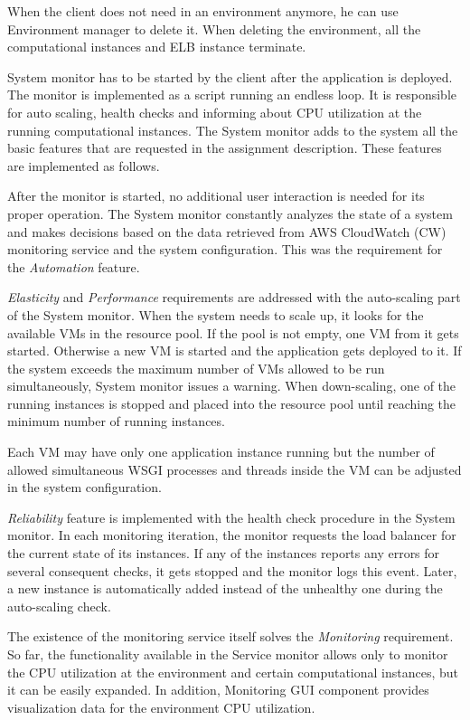 \documentclass[conference]{IEEEtran}
\begin{document}
When the client does not need in an environment anymore, he can use Environment manager to delete it. When deleting the environment, all the computational instances and ELB instance terminate.

System monitor has to be started by the client after the application is deployed. The monitor is implemented as a script running an endless loop. It is responsible for auto scaling, health checks and informing about CPU utilization at the running computational instances. The System monitor adds to the system all the basic features that are requested in the assignment description. These features are implemented as follows.

After the monitor is started, no additional user interaction is needed for its proper operation. The System monitor constantly analyzes the state of a system and makes decisions based on the data retrieved from AWS CloudWatch (CW) monitoring service and the system configuration. This was the requirement for the \emph{Automation} feature. 

\emph{Elasticity} and \emph{Performance} requirements are addressed with the auto-scaling part of the System monitor. When the system needs to scale up, it looks for the available VMs in the resource pool. If the pool is not empty, one VM from it gets started. Otherwise a new VM is started and the application gets deployed to it. If the system exceeds the maximum number of VMs allowed to be run simultaneously, System monitor issues a warning. When down-scaling, one of the running instances is stopped and placed into the resource pool until reaching the minimum number of running instances.

Each VM may have only one application instance running but the number of allowed simultaneous WSGI processes and threads inside the VM can be adjusted in the system configuration.

\emph{Reliability} feature is implemented with the health check procedure in the System monitor. In each monitoring iteration, the monitor requests the load balancer for the current state of its instances. If any of the instances reports any errors for several consequent checks, it gets stopped and the monitor logs this event. Later, a new instance is automatically added instead of the unhealthy one during the auto-scaling check.

The existence of the monitoring service itself solves the \emph{Monitoring} requirement. So far, the functionality available in the Service monitor allows only to monitor the CPU utilization at the environment and certain computational instances, but it can be easily expanded. In addition, Monitoring GUI component provides visualization data for the environment CPU utilization. 
\end{document}
